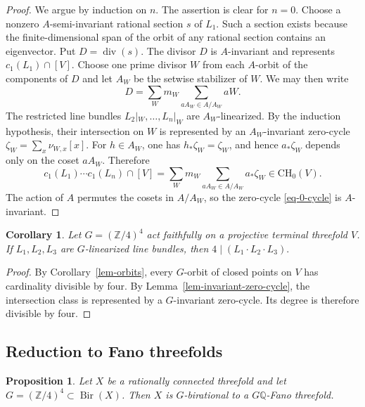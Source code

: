 \documentclass[10pt,oneside,reqno]{amsart}
\numberwithin{equation}{section}
\newtheorem{proposition}[theorem]{Proposition}
\newtheorem{corollary}[theorem]{Corollary}
\theoremstyle{definition}
\newcommand{\Z}{\mathbb Z}
\newcommand{\Q}{\mathbb Q}
\begin{document}
\begin{proof}
We argue by induction on $n$.  The assertion is clear for $n=0$.
Choose a nonzero $A$-semi-invariant rational section $s$ of $L_1$.
Such a section exists because the finite-dimensional span of the orbit of any
rational section contains an eigenvector.  Put $D=\operatorname{div}(s)$.
The divisor $D$ is $A$-invariant and represents
$c_1(L_1)\cap[V]$.  Choose one prime divisor $W$ from each $A$-orbit
of the components of $D$ and let $A_W$ be the setwise stabilizer of
$W$.  We may then write
\[
 D=
 \sum_W m_W\sum_{aA_W\in A/A_W}aW.
\]
The restricted line bundles $L_2|_W,\ldots,L_n|_W$ are
$A_W$-linearized.  By the induction hypothesis, their intersection on
$W$ is represented by an $A_W$-invariant zero-cycle
$\zeta_W=\sum_x \nu_{W,x}[x]$.  For $h\in A_W$, one has
$h_*\zeta_W=\zeta_W$, and hence $a_*\zeta_W$ depends only on the coset
$aA_W$.  Therefore
\begin{equation}
\label{eq-0-cycle}
 c_1(L_1)\cdots c_1(L_n)\cap[V]
 =\sum_W m_W\sum_{aA_W\in A/A_W}a_*\zeta_W
\in \mathrm{CH}_0(V).
\end{equation}
The action of $A$ permutes the cosets in $A/A_W$, so the zero-cycle \eqref{eq-0-cycle} is $A$-invariant.
\end{proof}

\begin{corollary}
\label{cor-intersection-divisibility}
Let $G=(\Z/4)^4$ act faithfully on a projective terminal threefold
$V$.  If $L_1,L_2,L_3$ are $G$-linearized line bundles, then
$
 4\mid(L_1\cdot L_2\cdot L_3).
$
\end{corollary}

\begin{proof}
By Corollary~\ref{lem-orbits}, every $G$-orbit of closed points on
$V$ has cardinality divisible by four.  By
Lemma~\ref{lem-invariant-zero-cycle}, the intersection class is
represented by a $G$-invariant zero-cycle.  Its degree is therefore
divisible by four.
\end{proof}

\subsection{Reduction to Fano threefolds}


\begin{proposition}
\label{prop-mmp}
Let $X$ be a rationally connected threefold and let
$G=(\Z/4)^4\subset\operatorname{Bir}(X)$.  Then $X$ is
$G$-birational to a $G\Q$-Fano threefold.
\end{proposition}
\end{document}
